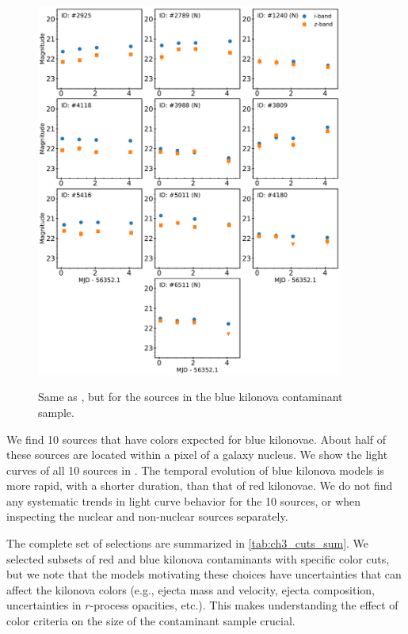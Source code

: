 \begin{figure}[!t]
\begin{center}
\hspace*{-0.1in}
\scalebox{1.}
{\includegraphics[width=0.9\textwidth]{./figs/chapter3/f5.pdf}}
\caption{Same as , but for the sources in the blue kilonova contaminant sample.}
\label{fig:ch3_final_lc_blue}
\end{center}
\vspace{1.1cm}
\end{figure}

\clearpage
We find 10 sources that have colors expected for blue kilonovae. About half of these sources are located within a pixel of a galaxy nucleus. We show the light curves of all 10 sources in . The temporal evolution of blue kilonova models is more rapid, with a shorter duration, than that of red kilonovae. We do not find any systematic trends in light curve behavior for the 10 sources, or when inspecting the nuclear and non-nuclear sources separately.

The complete set of selections are summarized in \cref{tab:ch3_cuts_sum}. We selected subsets of red and blue kilonova contaminants with specific color cuts, but we note that the models motivating these choices have uncertainties that can affect the kilonova colors (e.g., ejecta mass and velocity, ejecta composition, uncertainties in $r$-process opacities, etc.). This makes understanding the effect of color criteria on the size of the contaminant sample crucial.

